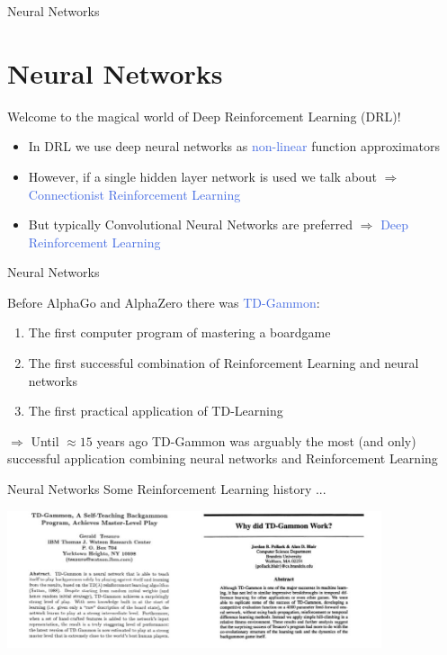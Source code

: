 \documentclass{beamer}
\begin{document}
\begin{frame}{Neural Networks}
	\section{Neural Networks}

	\begin{center}
		\textcolor{skymagenta}{Welcome to the magical world of Deep Reinforcement Learning (DRL)!}
	\end{center}

	\begin{itemize}
		\item In DRL we use deep neural networks as \textcolor{RoyalBlue}{non-linear} function approximators
		\item However, if a single hidden layer network is used we talk about $\Rightarrow$ \textcolor{RoyalBlue}{Connectionist Reinforcement Learning}	
		\item But typically Convolutional Neural Networks are preferred $\Rightarrow$ \textcolor{RoyalBlue}{Deep Reinforcement Learning}
	\end{itemize}
	
\end{frame}

\begin{frame}{Neural Networks}

	Before AlphaGo and AlphaZero there was \textcolor{RoyalBlue}{TD-Gammon}:
	\begin{enumerate}
		\item The first computer program of mastering a boardgame  
		\item The first successful combination of Reinforcement Learning and neural networks
		\item The first practical application of TD-Learning
	\end{enumerate}

	\begin{center}
		$\Rightarrow$ Until $\approx 15$ years ago TD-Gammon was arguably the most (and only) successful application combining neural networks and Reinforcement Learning
	\end{center}
\end{frame}


\begin{frame}{Neural Networks}
	Some Reinforcement Learning history ...
	\bigskip

	\centering
		\includegraphics[width=11cm]{./Images/tdgammon}

\end{frame}
\end{document}
